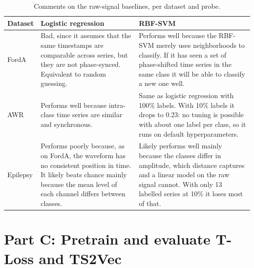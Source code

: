 \documentclass[a4paper,11pt]{article}
\begin{document}
\begin{table}[htbp]
    \centering
    \small
    \begin{tabular}{l p{5.8cm} p{5.8cm}}
        \toprule
        Dataset & Logistic regression & RBF-SVM \\
        \midrule
        FordA & Bad, since it assumes that the same timestamps are comparable across series, but they are not phase-synced. Equivalent to random guessing. & Performs well because the RBF-SVM merely uses neighborhoods to classify. If it has seen a set of phase-shifted time series in the same class it will be able to classify a new one well. \\
        \midrule
        AWR & Performs well because intra-class time series are similar and synchronous. & Same as logistic regression with 100\% labels. With 10\% labels it drops to 0.23: no tuning is possible with about one label per class, so it runs on default hyperparameters. \\
        \midrule
        Epilepsy & Performs poorly because, as on FordA, the waveform has no consistent position in time. It likely beats chance mainly because the mean level of each channel differs between classes. & Likely performs well mainly because the classes differ in amplitude, which distance captures and a linear model on the raw signal cannot. With only 13 labelled series at 10\% it loses most of that. \\
        \bottomrule
    \end{tabular}
    \caption{Comments on the raw-signal baselines, per dataset and probe.}
    \label{tab:baselines-comments}
\end{table}

\section{Part C: Pretrain and evaluate T-Loss and TS2Vec}
\end{document}
